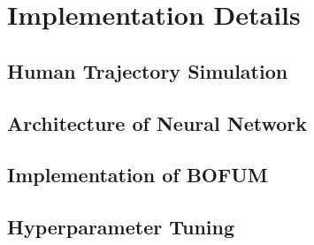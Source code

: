 \chapter{Implementation Details}

\section{Human Trajectory Simulation}

\section{Architecture of Neural Network}

\section{Implementation of BOFUM}

\section{Hyperparameter Tuning}

